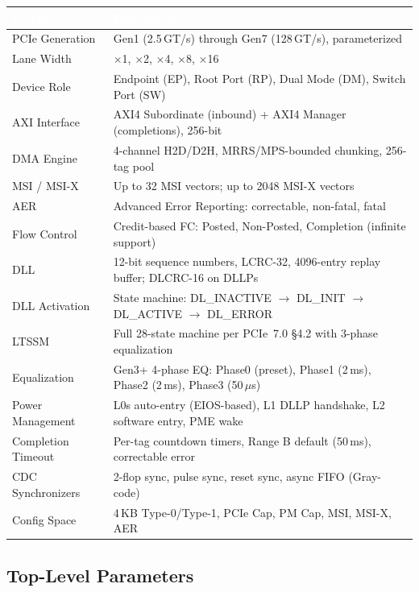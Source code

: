 \documentclass[11pt,a4paper]{article}
\newcommand{\theadcell}[1]{%
  \cellcolor{tablehead}\textcolor{white}{\textbf{#1}}}
\begin{document}
\begin{tabular}{p{5cm}p{9cm}}
  \toprule
  \theadcell{Feature} & \theadcell{Description} \\
  \midrule
  PCIe Generation & Gen1 (2.5\,GT/s) through Gen7 (128\,GT/s), parameterized \\
  Lane Width       & $\times$1, $\times$2, $\times$4, $\times$8, $\times$16 \\
  Device Role      & Endpoint (EP), Root Port (RP), Dual Mode (DM), Switch Port (SW) \\
  AXI Interface    & AXI4 Subordinate (inbound) + AXI4 Manager (completions), 256-bit \\
  DMA Engine       & 4-channel H2D/D2H, MRRS/MPS-bounded chunking, 256-tag pool \\
  MSI / MSI-X      & Up to 32 MSI vectors; up to 2048 MSI-X vectors \\
  AER              & Advanced Error Reporting: correctable, non-fatal, fatal \\
  Flow Control     & Credit-based FC: Posted, Non-Posted, Completion (infinite support) \\
  DLL              & 12-bit sequence numbers, LCRC-32, 4096-entry replay buffer; DLCRC-16 on DLLPs \\
  DLL Activation   & State machine: DL\_INACTIVE $\to$ DL\_INIT $\to$ DL\_ACTIVE $\to$ DL\_ERROR \\
  LTSSM            & Full 28-state machine per PCIe~7.0 \S4.2 with 3-phase equalization \\
  Equalization     & Gen3+ 4-phase EQ: Phase0 (preset), Phase1 (2\,ms), Phase2 (2\,ms), Phase3 (50\,$\mu$s) \\
  Power Management & L0s auto-entry (EIOS-based), L1 DLLP handshake, L2 software entry, PME wake \\
  Completion Timeout & Per-tag countdown timers, Range B default (50\,ms), correctable error \\
  CDC Synchronizers & 2-flop sync, pulse sync, reset sync, async FIFO (Gray-code) \\
  Config Space     & 4\,KB Type-0/Type-1, PCIe Cap, PM Cap, MSI, MSI-X, AER \\
  \bottomrule
\end{tabular}

\subsection{Top-Level Parameters}
\end{document}
